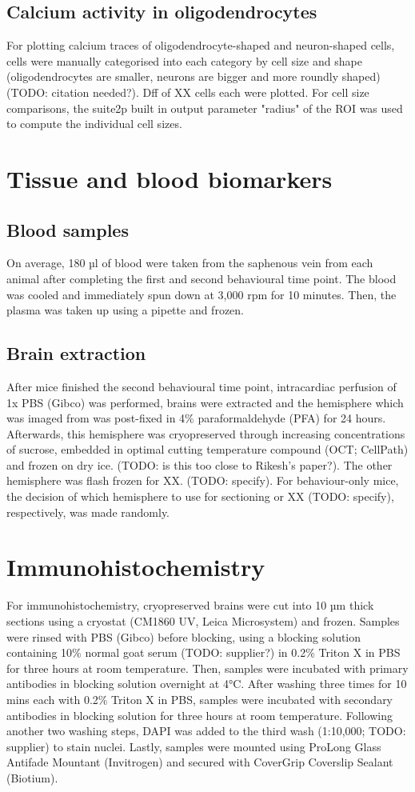 \subsection{Calcium activity in oligodendrocytes}
For plotting calcium traces of oligodendrocyte-shaped and neuron-shaped cells, cells were manually categorised into each category by cell size and shape (oligodendrocytes are smaller, neurons are bigger and more roundly shaped) (TODO: citation needed?). Dff of XX cells each were plotted.
For cell size comparisons, the suite2p built in output parameter "radius" of the ROI was used to compute the individual cell sizes. 
\section{Tissue and blood biomarkers}
\subsection{Blood samples}
On average, 180 µl of blood were taken from the saphenous vein from each animal after completing the first and second behavioural time point. The blood was cooled and immediately spun down at 3,000 rpm for 10 minutes. Then, the plasma was taken up using a pipette and frozen.
\subsection{Brain extraction}
After mice finished the second behavioural time point, intracardiac perfusion of 1x PBS (Gibco) was performed, brains were extracted and the hemisphere which was imaged from was post-fixed in 4\% paraformaldehyde (PFA) for 24 hours. Afterwards, this hemisphere was cryopreserved through increasing concentrations of sucrose, embedded in optimal cutting temperature compound (OCT; CellPath) and frozen on dry ice. (TODO: is this too close to Rikesh's paper?). The other hemisphere was flash frozen for XX. (TODO: specify).
For behaviour-only mice, the decision of which hemisphere to use for sectioning or XX (TODO: specify), respectively, was made randomly.
\section{Immunohistochemistry}
\label{Immunohistochemistry}
For immunohistochemistry, cryopreserved brains were cut into 10 µm thick sections using a cryostat (CM1860 UV, Leica Microsystem) and frozen.
Samples were rinsed with PBS (Gibco) before blocking, using a blocking solution containing 10\% normal goat serum (TODO: supplier?) in 0.2\% Triton X in PBS for three hours at room temperature. Then, samples were incubated with primary antibodies in blocking solution overnight at 4°C.
After washing three times for 10 mins each with 0.2\% Triton X in PBS, samples were incubated with secondary antibodies in blocking solution for three hours at room temperature.
Following another two washing steps, DAPI was added to the third wash (1:10,000; TODO: supplier) to stain nuclei.
Lastly, samples were mounted using ProLong Glass Antifade Mountant (Invitrogen) and secured with CoverGrip Coverslip Sealant (Biotium).

